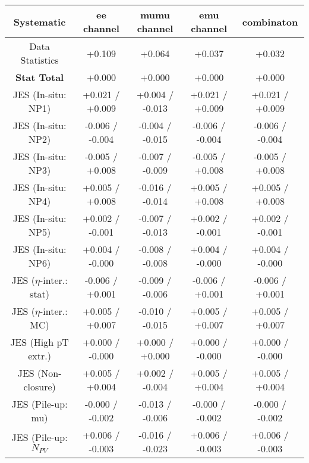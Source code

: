 \begin{table}[htbp]
\scriptsize
  \begin{center} 
  \begin{tabular}{|c|c|c|c|c|}
  \hline
Systematic                            &  ee channel&  mumu channel&  emu channel&  combinaton\\
  \hline
Data Statistics                       &+0.109              & +0.064              & +0.037              & +0.032             \\
\hline
\textbf{Stat Total}                   &+0.000              & +0.000              & +0.000              & +0.000             \\
\hline
JES (In-situ: NP1)                    &+0.021   / +0.009   & +0.004   / -0.013   & +0.021   / +0.009   & +0.021   / +0.009  \\
JES (In-situ: NP2)                    &-0.006   / -0.004   & -0.004   / -0.015   & -0.006   / -0.004   & -0.006   / -0.004  \\
JES (In-situ: NP3)                    &-0.005   / +0.008   & -0.007   / -0.009   & -0.005   / +0.008   & -0.005   / +0.008  \\
JES (In-situ: NP4)                    &+0.005   / +0.008   & -0.016   / -0.014   & +0.005   / +0.008   & +0.005   / +0.008  \\
JES (In-situ: NP5)                    &+0.002   / -0.001   & -0.007   / -0.013   & +0.002   / -0.001   & +0.002   / -0.001  \\
JES (In-situ: NP6)                    &+0.004   / -0.000   & -0.008   / -0.008   & +0.004   / -0.000   & +0.004   / -0.000  \\
JES ($\eta$-inter.: stat)               &-0.006   / +0.001   & -0.009   / -0.006   & -0.006   / +0.001   & -0.006   / +0.001  \\
JES ($\eta$-inter.: MC)                 &+0.005   / +0.007   & -0.010   / -0.015   & +0.005   / +0.007   & +0.005   / +0.007  \\
JES (High pT extr.)                  &+0.000   / -0.000   & +0.000   / +0.000   & +0.000   / -0.000   & +0.000   / -0.000  \\
JES (Non-closure)                     &+0.005   / +0.004   & +0.002   / -0.004   & +0.005   / +0.004   & +0.005   / +0.004  \\
JES (Pile-up: mu)                     &-0.000   / -0.002   & -0.013   / -0.006   & -0.000   / -0.002   & -0.000   / -0.002  \\
JES (Pile-up: $N_{PV}$                  &+0.006   / -0.003   & -0.016   / -0.023   & +0.006   / -0.003   & +0.006   / -0.003  \\

\end{tabular}
\end{center}
\end{table}
